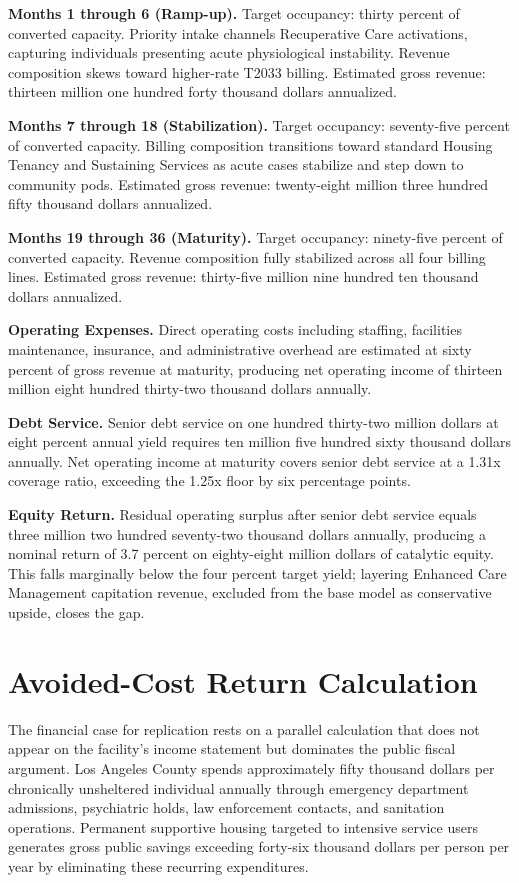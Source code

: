 \documentclass[12pt, letterpaper]{article}
\begin{document}
\textbf{Months 1 through 6 (Ramp-up).} Target occupancy: thirty percent of converted capacity. Priority intake channels Recuperative Care activations, capturing individuals presenting acute physiological instability. Revenue composition skews toward higher-rate T2033 billing. Estimated gross revenue: thirteen million one hundred forty thousand dollars annualized.

\textbf{Months 7 through 18 (Stabilization).} Target occupancy: seventy-five percent of converted capacity. Billing composition transitions toward standard Housing Tenancy and Sustaining Services as acute cases stabilize and step down to community pods. Estimated gross revenue: twenty-eight million three hundred fifty thousand dollars annualized.

\textbf{Months 19 through 36 (Maturity).} Target occupancy: ninety-five percent of converted capacity. Revenue composition fully stabilized across all four billing lines. Estimated gross revenue: thirty-five million nine hundred ten thousand dollars annualized.

\textbf{Operating Expenses.} Direct operating costs including staffing, facilities maintenance, insurance, and administrative overhead are estimated at sixty percent of gross revenue at maturity, producing net operating income of thirteen million eight hundred thirty-two thousand dollars annually.

\textbf{Debt Service.} Senior debt service on one hundred thirty-two million dollars at eight percent annual yield requires ten million five hundred sixty thousand dollars annually. Net operating income at maturity covers senior debt service at a 1.31x coverage ratio, exceeding the 1.25x floor by six percentage points.

\textbf{Equity Return.} Residual operating surplus after senior debt service equals three million two hundred seventy-two thousand dollars annually, producing a nominal return of 3.7 percent on eighty-eight million dollars of catalytic equity. This falls marginally below the four percent target yield; layering Enhanced Care Management capitation revenue, excluded from the base model as conservative upside, closes the gap.

\clearpage
\section{Avoided-Cost Return Calculation}

The financial case for replication rests on a parallel calculation that does not appear on the facility's income statement but dominates the public fiscal argument. Los Angeles County spends approximately fifty thousand dollars per chronically unsheltered individual annually through emergency department admissions, psychiatric holds, law enforcement contacts, and sanitation operations. Permanent supportive housing targeted to intensive service users generates gross public savings exceeding forty-six thousand dollars per person per year by eliminating these recurring expenditures.
\end{document}
